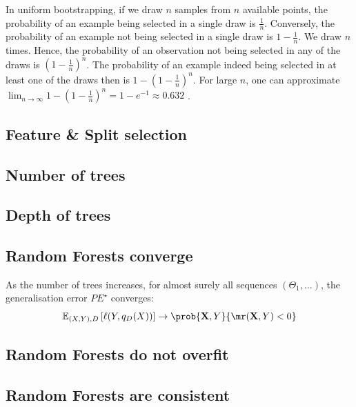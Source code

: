 \documentclass[../main.tex]{subfiles}
\begin{document}
In uniform bootstrapping, if we draw $n$ samples from $n$ available points, the probability of an example being selected in a single draw is $\frac{1}{n}$. Conversely, the probability of an example not being selected in a single draw is $1-\frac{1}{n}$. We draw $n$ times. Hence, the probability of an observation not being selected in any of the draws is $(1-\frac{1}{n})^n$. The probability of an example indeed being selected in at least one of the draws then is $1 - (1 - \frac{1}{n})^n$.  For large $n$, one can approximate $\lim_{ n \to \infty }1-(1-\frac{1}{n})^n = 1- e^{-1} \approx 0.632$ \cite{todo}.


\subsection{Feature \& Split selection}


\subsection{Number of trees}

\subsection{Depth of trees}

\subsection{Random Forests converge}


As the number of trees increases, for almost surely all sequences $(\Theta_{1}, \dots)$, the generalisation error $PE^\star$ converges:
$$
\mathbb{E}_{(X,Y), D}\left[ \ell(Y, q_{D}(X)) \right]  \to
\prob{\vec{X}, Y}{
\mr(\vec{X}, Y)  < 0
}
$$

\subsection{Random Forests do not overfit}

\subsection{Random Forests are consistent}
\end{document}
